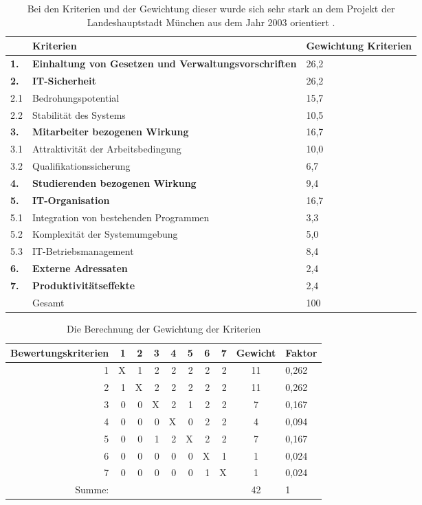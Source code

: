 \documentclass[12pt,utf8]{scrartcl}
\begin{document}
\begin{table}[h]
\begin{tabular}{|p{}|p{12cm}|p{2cm}|}
\hline
 & Kriterien & Gewichtung Kriterien\\
\hline
\textbf{1.} &  \textbf{Einhaltung von Gesetzen und Verwaltungsvorschriften}  & 26,2\\
\hline
\hline
\textbf{2.} & \textbf{IT-Sicherheit} & 26,2\\
\hline
2.1 & Bedrohungspotential & 15,7 \\
\hline
2.2 & Stabilität des Systems & 10,5 \\
\hline
\hline
\textbf{3.} & \textbf{Mitarbeiter bezogenen Wirkung} & 16,7\\
\hline
3.1 & Attraktivität der Arbeitsbedingung & 10,0 \\
\hline
3.2 & Qualifikationssicherung & 6,7 \\
\hline
\hline
\textbf{4.} & \textbf{Studierenden bezogenen Wirkung} & 9,4\\
\hline
\hline
\textbf{5.} & \textbf{IT-Organisation} & 16,7\\
\hline
5.1 & Integration von bestehenden Programmen & 3,3 \\
\hline
5.2 & Komplexität der Systemumgebung & 5,0 \\
\hline
5.3 & IT-Betriebsmanagement & 8,4 \\
\hline
\hline
\textbf{6.} & \textbf{Externe Adressaten} & 2,4\\
\hline
\hline
\textbf{7.} & \textbf{Produktivitätseffekte} & 2,4\\
\hline
\hline
\hline
 & Gesamt & 100\\
\hline
\end{tabular}
\caption*{Bei den Kriterien und der Gewichtung dieser wurde sich sehr stark an dem Projekt der Landeshauptstadt München aus dem Jahr 2003 orientiert \citep{muenchen}.}
\end{table}

\begin{table}[h!]
\centering
\begin{tabular}{|r|r|r|r|r|r|r|r|c|l|}
\hline
Bewertungskriterien & 1 & 2 & 3 & 4 & 5 & 6 & 7 & Gewicht & Faktor \\
\hline
1 & X & 1 & 2 & 2 & 2 & 2 & 2 & 11 & 0,262 \\
\hline
2 & 1 & X & 2 & 2 & 2 & 2 & 2 & 11 & 0,262 \\
\hline
3 & 0 & 0 & X & 2 & 1 & 2 & 2 & 7 & 0,167 \\
\hline
4 & 0 & 0 & 0 & X & 0 & 2 & 2 & 4 & 0,094 \\
\hline
5 & 0 & 0 & 1 & 2 & X & 2 & 2 & 7 & 0,167 \\
\hline
6 & 0 & 0 & 0 & 0 & 0 & X & 1 & 1 & 0,024 \\
\hline
7 & 0 & 0 & 0 & 0 & 0 & 1 & X & 1 & 0,024 \\
\hline
Summe: & & & & & & & & 42 & 1 \\
\hline
\end{tabular}
\caption*{Die Berechnung der Gewichtung der Kriterien}
\end{table}
\end{document}
